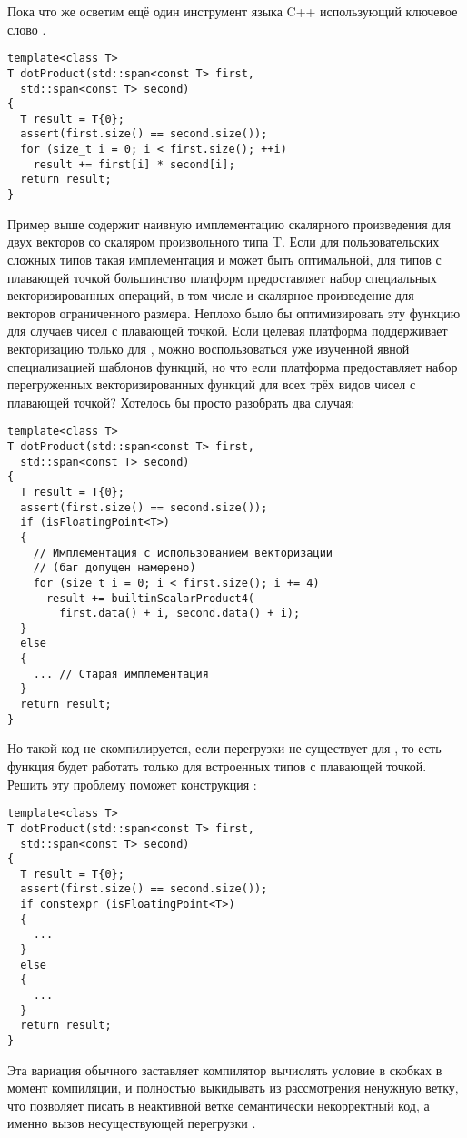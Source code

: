 Пока что же осветим ещё один инструмент языка C++ использующий ключевое слово .
\begin{verbatim}
template<class T>
T dotProduct(std::span<const T> first,
  std::span<const T> second)
{
  T result = T{0};
  assert(first.size() == second.size());
  for (size_t i = 0; i < first.size(); ++i)
    result += first[i] * second[i];
  return result;
}
\end{verbatim}
Пример выше содержит наивную имплементацию скалярного произведения для двух векторов со скаляром произвольного типа T.
Если для пользовательских сложных типов  такая имплементация и может быть оптимальной, для типов с плавающей точкой большинство платформ предоставляет набор специальных векторизированных операций, в том числе и скалярное произведение для векторов ограниченного размера.
Неплохо было бы оптимизировать эту функцию для случаев чисел с плавающей точкой.
Если целевая платформа поддерживает векторизацию только для , можно воспользоваться уже изученной явной специализацией шаблонов функций, но что если платформа предоставляет набор перегруженных векторизированных функций для всех трёх видов чисел с плавающей точкой? Хотелось бы просто разобрать два случая:
\begin{verbatim}
template<class T>
T dotProduct(std::span<const T> first,
  std::span<const T> second)
{
  T result = T{0};
  assert(first.size() == second.size());
  if (isFloatingPoint<T>)
  {
    // Имплементация с использованием векторизации
    // (баг допущен намерено)
    for (size_t i = 0; i < first.size(); i += 4)
      result += builtinScalarProduct4(
        first.data() + i, second.data() + i);
  }
  else
  {
    ... // Старая имплементация
  }
  return result;
}
\end{verbatim}
Но такой код не скомпилируется, если перегрузки  не существует для , то есть функция будет работать только для встроенных типов с плавающей точкой.
Решить эту проблему поможет конструкция :
\begin{verbatim}
template<class T>
T dotProduct(std::span<const T> first,
  std::span<const T> second)
{
  T result = T{0};
  assert(first.size() == second.size());
  if constexpr (isFloatingPoint<T>)
  {
    ...
  }
  else
  {
    ...
  }
  return result;
}
\end{verbatim}
Эта вариация обычного  заставляет компилятор вычислять условие в скобках в момент компиляции, и полностью выкидывать из рассмотрения ненужную ветку, что позволяет писать в неактивной ветке семантически некорректный код, а именно вызов несуществующей перегрузки .
